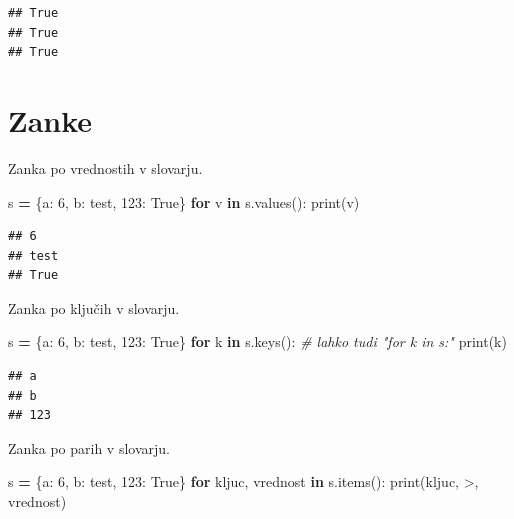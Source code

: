 \documentclass[
]{report}
\newenvironment{Shaded}{\begin{snugshade}}{\end{snugshade}}
\newcommand{\BuiltInTok}[1]{#1}
\newcommand{\CommentTok}[1]{\textcolor[rgb]{0.56,0.35,0.01}{\textit{#1}}}
\newcommand{\ControlFlowTok}[1]{\textcolor[rgb]{0.13,0.29,0.53}{\textbf{#1}}}
\newcommand{\DecValTok}[1]{\textcolor[rgb]{0.00,0.00,0.81}{#1}}
\newcommand{\KeywordTok}[1]{\textcolor[rgb]{0.13,0.29,0.53}{\textbf{#1}}}
\newcommand{\NormalTok}[1]{#1}
\newcommand{\OperatorTok}[1]{\textcolor[rgb]{0.81,0.36,0.00}{\textbf{#1}}}
\newcommand{\StringTok}[1]{\textcolor[rgb]{0.31,0.60,0.02}{#1}}
\newcommand{\VariableTok}[1]{\textcolor[rgb]{0.00,0.00,0.00}{#1}}
\begin{document}
\begin{verbatim}
## True
## True
## True
\end{verbatim}

\hypertarget{zanke-2}{%
\section{Zanke}\label{zanke-2}}

Zanka po vrednostih v slovarju.

\begin{Shaded}
\begin{Highlighting}[]
\NormalTok{s }\OperatorTok{=}\NormalTok{ \{}\StringTok{\textquotesingle{}a\textquotesingle{}}\NormalTok{: }\DecValTok{6}\NormalTok{, }\StringTok{\textquotesingle{}b\textquotesingle{}}\NormalTok{: }\StringTok{\textquotesingle{}test\textquotesingle{}}\NormalTok{, }\DecValTok{123}\NormalTok{: }\VariableTok{True}\NormalTok{\}}
\ControlFlowTok{for}\NormalTok{ v }\KeywordTok{in}\NormalTok{ s.values():}
    \BuiltInTok{print}\NormalTok{(v)}
\end{Highlighting}
\end{Shaded}

\begin{verbatim}
## 6
## test
## True
\end{verbatim}

Zanka po ključih v slovarju.

\begin{Shaded}
\begin{Highlighting}[]
\NormalTok{s }\OperatorTok{=}\NormalTok{ \{}\StringTok{\textquotesingle{}a\textquotesingle{}}\NormalTok{: }\DecValTok{6}\NormalTok{, }\StringTok{\textquotesingle{}b\textquotesingle{}}\NormalTok{: }\StringTok{\textquotesingle{}test\textquotesingle{}}\NormalTok{, }\DecValTok{123}\NormalTok{: }\VariableTok{True}\NormalTok{\}}
\ControlFlowTok{for}\NormalTok{ k }\KeywordTok{in}\NormalTok{ s.keys(): }\CommentTok{\# lahko tudi "for k in s:"}
    \BuiltInTok{print}\NormalTok{(k)}
\end{Highlighting}
\end{Shaded}

\begin{verbatim}
## a
## b
## 123
\end{verbatim}

Zanka po parih v slovarju.

\begin{Shaded}
\begin{Highlighting}[]
\NormalTok{s }\OperatorTok{=}\NormalTok{ \{}\StringTok{\textquotesingle{}a\textquotesingle{}}\NormalTok{: }\DecValTok{6}\NormalTok{, }\StringTok{\textquotesingle{}b\textquotesingle{}}\NormalTok{: }\StringTok{\textquotesingle{}test\textquotesingle{}}\NormalTok{, }\DecValTok{123}\NormalTok{: }\VariableTok{True}\NormalTok{\}}
\ControlFlowTok{for}\NormalTok{ kljuc, vrednost }\KeywordTok{in}\NormalTok{ s.items():}
    \BuiltInTok{print}\NormalTok{(kljuc, }\StringTok{\textquotesingle{}{-}\textgreater{}\textquotesingle{}}\NormalTok{, vrednost)}
\end{Highlighting}
\end{Shaded}
\end{document}
